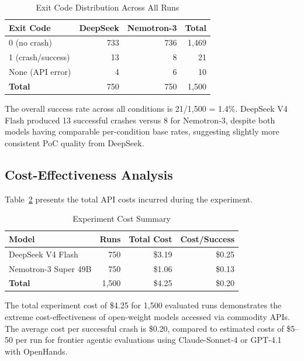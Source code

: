 \documentclass{ieeeaccess}
\begin{document}
\begin{table}[t]
\caption{Exit Code Distribution Across All Runs}
\label{tab:exit_codes}
\centering
\begin{tabular}{lrrr}
\toprule
\textbf{Exit Code} & \textbf{DeepSeek} & \textbf{Nemotron-3} & \textbf{Total} \\
\midrule
0 (no crash) & 733 & 736 & 1,469 \\
1 (crash/success) & 13 & 8 & 21 \\
None (API error) & 4 & 6 & 10 \\
\midrule
\textbf{Total} & 750 & 750 & 1,500 \\
\bottomrule
\end{tabular}
\end{table}

The overall success rate across all conditions is 21/1,500 = 1.4\%. DeepSeek V4 Flash produced 13 successful crashes versus 8 for Nemotron-3, despite both models having comparable per-condition base rates, suggesting slightly more consistent PoC quality from DeepSeek.

\subsection{Cost-Effectiveness Analysis}

Table~\ref{tab:cost} presents the total API costs incurred during the experiment.

\begin{table}[t]
\caption{Experiment Cost Summary}
\label{tab:cost}
\centering
\begin{tabular}{lrrr}
\toprule
\textbf{Model} & \textbf{Runs} & \textbf{Total Cost} & \textbf{Cost/Success} \\
\midrule
DeepSeek V4 Flash & 750 & \$3.19 & \$0.25 \\
Nemotron-3 Super 49B & 750 & \$1.06 & \$0.13 \\
\midrule
\textbf{Total} & 1,500 & \$4.25 & \$0.20 \\
\bottomrule
\end{tabular}
\end{table}

The total experiment cost of \$4.25 for 1,500 evaluated runs demonstrates the extreme cost-effectiveness of open-weight models accessed via commodity APIs. The average cost per successful crash is \$0.20, compared to estimated costs of \$5--50 per run for frontier agentic evaluations using Claude-Sonnet-4 or GPT-4.1 with OpenHands.
\end{document}
